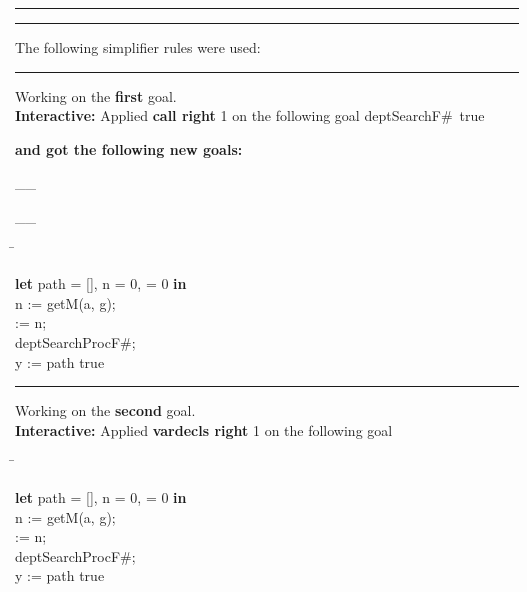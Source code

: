 \documentclass[a4paper]{article}
\begin{document}
\rule{1\textwidth}{1ex}



\rule{1\textwidth}{1ex}


The following simplifier rules were used:


\rule{1\textwidth}{1ex}


Working on the {\bf first} goal.\\
{\bf Interactive:} Applied {\bf call right} 1 on the following goal 
 \Fol \Do deptSearchF\#\Dc\ true



{\bf and got the following new goals:}

\_\hrulefill \_

 \Fol 

\_\hrulefill \_

\begin{flushleft}


\Fol


\begin{tabbing}
\Do\= \+

{\bf let} path = [], n = 0,  = 0 {\bf in} \\ 
n := getM(a, g); \\ 
  := n; \\ 
 deptSearchProcF\#; \\ 
 y := path\Dc\-
true
\end{tabbing}


\end{flushleft}



\rule{1\textwidth}{1ex}


Working on the {\bf second} goal.\\
{\bf Interactive:} Applied {\bf vardecls right} 1 on the following goal 
\begin{flushleft}


\Fol


\begin{tabbing}
\Do\= \+

{\bf let} path = [], n = 0,  = 0 {\bf in} \\ 
n := getM(a, g); \\ 
  := n; \\ 
 deptSearchProcF\#; \\ 
 y := path\Dc\-
true
\end{tabbing}


\end{flushleft}
\end{document}
